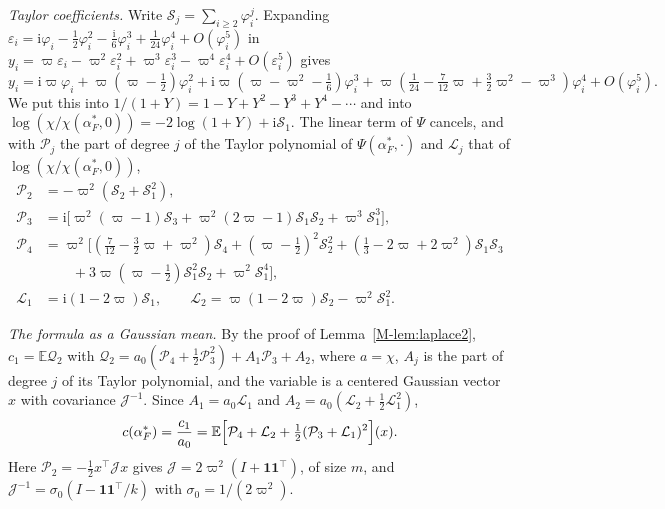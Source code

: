 \documentclass[EJP,preprint]{ejpecp}
\newcommand{\mref}[1]{\ref*{M-#1}}
\newcommand{\E}{\mathbb{E}}
\newcommand{\ones}{\mathbf{1}}
\begin{document}
\emph{Taylor coefficients.} Write $\mathcal S_j=\sum_{i\ge2}\varphi_i^j$. Expanding
$\varepsilon_i=\mathrm i\varphi_i-\frac12\varphi_i^2-\frac{\mathrm i}6\varphi_i^3+\frac1{24}\varphi_i^4+O(\varphi_i^5)$ in
$y_i=\varpi\varepsilon_i-\varpi^2\varepsilon_i^2+\varpi^3\varepsilon_i^3-\varpi^4\varepsilon_i^4+O(\varepsilon_i^5)$
gives
\[
y_i=\mathrm i\varpi\varphi_i+\varpi(\varpi-\tfrac12)\varphi_i^2
+\mathrm i\varpi(\varpi-\varpi^2-\tfrac16)\varphi_i^3
+\varpi(\tfrac1{24}-\tfrac7{12}\varpi+\tfrac32\varpi^2-\varpi^3)\varphi_i^4+O(\varphi_i^5).
\]
We put this into $1/(1+Y)=1-Y+Y^2-Y^3+Y^4-\cdots$ and into
$\log(\chi/\chi(\alpha^*_F,0))=-2\log(1+Y)+\mathrm i\mathcal S_1$. The linear term of $\Psi$ cancels, and
with $\mathcal P_j$ the part of degree $j$ of the Taylor polynomial of $\Psi(\alpha^*_F,\cdot)$ and $\mathcal L_j$
that of $\log(\chi/\chi(\alpha^*_F,0))$,
\begin{align*}
\mathcal P_2&=-\varpi^2(\mathcal S_2+\mathcal S_1^2),\\
\mathcal P_3&=\mathrm i\bigl[\varpi^2(\varpi-1)\mathcal S_3+\varpi^2(2\varpi-1)\mathcal S_1\mathcal S_2+\varpi^3\mathcal S_1^3\bigr],\\
\mathcal P_4&=\varpi^2\bigl[(\tfrac7{12}-\tfrac32\varpi+\varpi^2)\mathcal S_4+(\varpi-\tfrac12)^2\mathcal S_2^2
+(\tfrac13-2\varpi+2\varpi^2)\mathcal S_1\mathcal S_3\\
&\qquad+3\varpi(\varpi-\tfrac12)\mathcal S_1^2\mathcal S_2+\varpi^2\mathcal S_1^4\bigr],\\
\mathcal L_1&=\mathrm i(1-2\varpi)\mathcal S_1,\qquad \mathcal L_2=\varpi(1-2\varpi)\mathcal S_2-\varpi^2\mathcal S_1^2 .
\end{align*}

\emph{The formula as a Gaussian mean.} By the proof of Lemma~\mref{lem:laplace2},
$c_1=\E\mathcal Q_2$ with $\mathcal Q_2=a_0(\mathcal P_4+\frac12\mathcal P_3^2)+A_1\mathcal P_3+A_2$, where $a=\chi$,
$A_j$ is the part of degree $j$ of its Taylor polynomial, and the variable is a centered Gaussian
vector $x$ with covariance $\mathcal J^{-1}$. Since $A_1=a_0\mathcal L_1$ and $A_2=a_0(\mathcal L_2+\frac12\mathcal L_1^2)$,
\[
c(\alpha^*_F)=\frac{c_1}{a_0}=\E\Bigl[\mathcal P_4+\mathcal L_2+\tfrac12(\mathcal P_3+\mathcal L_1)^2\Bigr](x).
\]
Here $\mathcal P_2=-\frac12x^\top\mathcal Jx$ gives $\mathcal J=2\varpi^2(I+\ones\ones^\top)$, of size
$m$, and $\mathcal J^{-1}=\sigma_0(I-\ones\ones^\top/k)$ with $\sigma_0=1/(2\varpi^2)$.
\end{document}
